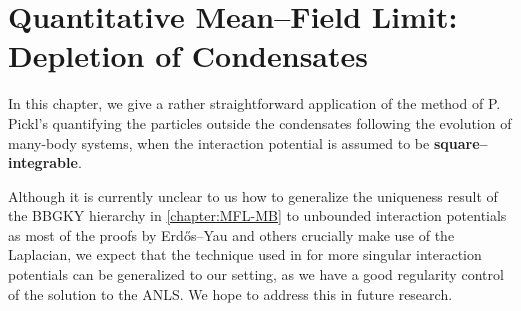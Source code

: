 \section{Quantitative Mean--Field Limit: Depletion of Condensates}\label{sec:depletion}

In this chapter, we give a rather straightforward application of the method of P. Pickl's quantifying the particles outside the condensates following the evolution of many-body systems, when the interaction potential is assumed to be \textbf{square--integrable}. 

\begin{rem*}
Although it is currently unclear to us how to generalize the uniqueness result of the BBGKY hierarchy in \ref{chapter:MFL-MB} to unbounded interaction potentials as most of the proofs by Erd{\H o}s--Yau and others crucially make use of the Laplacian, we expect that the technique used in \cite{KP10} for more singular interaction potentials can be generalized to our setting, as we have a good regularity control of the solution to the ANLS. We hope to address this in future research.
\end{rem*}


